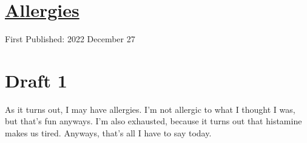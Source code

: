 \documentclass[12pt]{article}[titlepage]
\newcommand{\1}{\={a}}
\newcommand{\2}{\={e}}
\newcommand{\3}{\={\i}}
\newcommand{\4}{\=o}
\newcommand{\5}{\=u}
\newcommand{\6}{\={A}}
\renewcommand{\,}{\textsuperscript{,}}
\begin{document}
\doublespacing
\section{\href{allergies.html}{Allergies}}
First Published: 2022 December 27

\section{Draft 1}
As it turns out, I may have allergies.
I'm not allergic to what I thought I was, but that's fun anyways.
I'm also exhausted, because it turns out that histamine makes us tired.
Anyways, that's all I have to say today.
\end{document}
